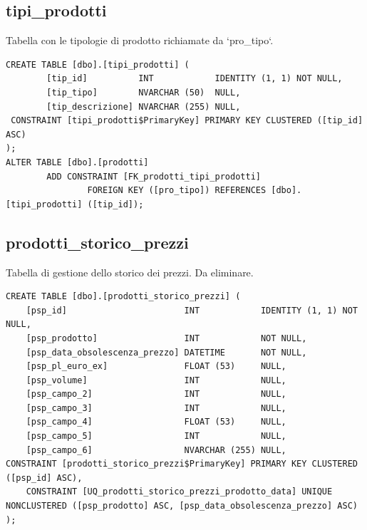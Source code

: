 \documentclass[12pt]{article}
\begin{document}
\subsection{tipi\_prodotti}
Tabella con le tipologie di prodotto richiamate da `pro\_tipo`.
\begin{lstlisting}
CREATE TABLE [dbo].[tipi_prodotti] (
        [tip_id]          INT            IDENTITY (1, 1) NOT NULL,
        [tip_tipo]        NVARCHAR (50)  NULL,
        [tip_descrizione] NVARCHAR (255) NULL,
 CONSTRAINT [tipi_prodotti$PrimaryKey] PRIMARY KEY CLUSTERED ([tip_id] ASC)
);
ALTER TABLE [dbo].[prodotti]
        ADD CONSTRAINT [FK_prodotti_tipi_prodotti]
                FOREIGN KEY ([pro_tipo]) REFERENCES [dbo].[tipi_prodotti] ([tip_id]);
\end{lstlisting}

\subsection{prodotti\_storico\_prezzi}
Tabella di gestione dello storico dei prezzi.
Da eliminare.
\begin{lstlisting}
CREATE TABLE [dbo].[prodotti_storico_prezzi] (
    [psp_id]                       INT            IDENTITY (1, 1) NOT NULL,
    [psp_prodotto]                 INT            NOT NULL,
    [psp_data_obsolescenza_prezzo] DATETIME       NOT NULL,
    [psp_pl_euro_ex]               FLOAT (53)     NULL,
    [psp_volume]                   INT            NULL,
    [psp_campo_2]                  INT            NULL,
    [psp_campo_3]                  INT            NULL,
    [psp_campo_4]                  FLOAT (53)     NULL,
    [psp_campo_5]                  INT            NULL,
    [psp_campo_6]                  NVARCHAR (255) NULL,
CONSTRAINT [prodotti_storico_prezzi$PrimaryKey] PRIMARY KEY CLUSTERED ([psp_id] ASC),
    CONSTRAINT [UQ_prodotti_storico_prezzi_prodotto_data] UNIQUE NONCLUSTERED ([psp_prodotto] ASC, [psp_data_obsolescenza_prezzo] ASC)
);
\end{lstlisting}
\end{document}
